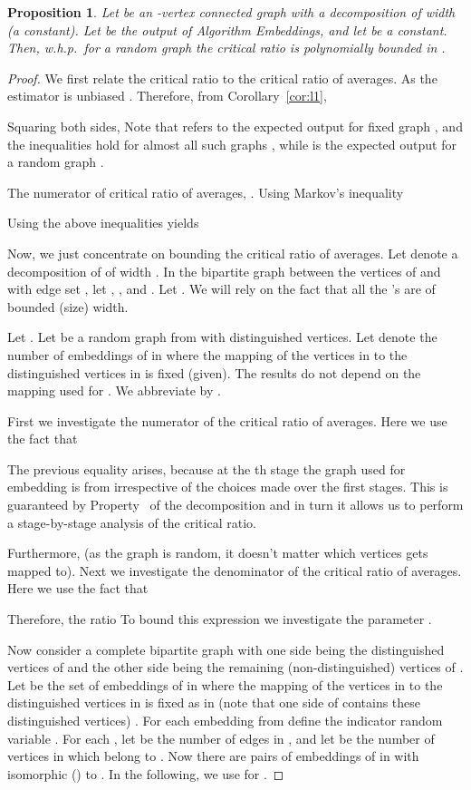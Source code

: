 \documentclass[11pt]{article}
\newtheorem{proposition}[theorem]{Proposition}
\begin{document}
\begin{proposition} \label{critical} \label{mainproof}
Let  be an -vertex connected graph with a decomposition of width  (a constant). Let  be the output of Algorithm Embeddings, and let  be a constant. Then,  w.h.p.\ for a random graph  the critical ratio  is polynomially bounded in .
\end{proposition}
\begin{proof}
We first relate the critical ratio to the critical ratio of averages. As the estimator is unbiased . Therefore, from Corollary~\ref{cor:l1},

Squaring both sides, 
Note that  refers to the expected output for fixed graph , and the inequalities hold for almost all such graphs , while  is the expected output for a random graph .

The numerator of critical ratio of averages, . Using Markov's inequality 

Using the above inequalities yields 


Now, we just concentrate on bounding the critical ratio of averages.  Let  denote a decomposition of  of width . In the bipartite graph  between the vertices of  and  with edge set , let , , and . Let . We will rely on the fact that all the 's are of bounded (size) width. 

Let . Let  be a random graph from  with  distinguished vertices. Let  denote the number of embeddings of  in  where the mapping of the vertices in  to the distinguished vertices in  is fixed (given). The results do not depend on the mapping used for . We abbreviate  by . 


First we investigate the numerator of the critical ratio of averages. Here we use the fact that

The previous equality arises, because at the th stage the graph used for embedding  is from  irrespective of the choices made over the first  stages. This is guaranteed by Property~ of the decomposition and in turn it allows us to perform a stage-by-stage analysis of the critical ratio.  

Furthermore,  (as the graph is random, it doesn't matter which vertices  gets mapped to). Next we investigate the  denominator of the critical ratio of averages. Here we use the fact that



Therefore, the ratio  To bound this expression we investigate the parameter . 

Now consider a complete bipartite graph  with one side being the  distinguished vertices of  and the other side being the remaining (non-distinguished) vertices of . Let  be the set of embeddings of  in  where the mapping of the vertices in  to the distinguished vertices in  is fixed as in  (note that one side of  contains these distinguished vertices) . For each embedding  from  define the indicator random variable . For each , let  be the number of edges in , and let  be the number of vertices in  which belong to . Now there are  pairs  of embeddings of  in  with  isomorphic () to . In the following, we use  for .  



\end{proof}
\end{document}
